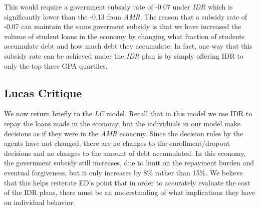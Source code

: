   This would require a government subsidy rate of -0.07 under \textit{IDR} which is significantly
  lower than the -0.13 from \textit{AMR}. The reason that a subsidy rate of -0.07 can maintain the
  same goverment subsidy is that we have increased the volume of student loans in the economy by
  changing what fraction of students accumulate debt and how much debt they accumulate. In fact, one
  way that this subsidy rate can be achieved under the \textit{IDR} plan is by simply offering IDR
  to only the top three GPA quartiles.


\subsection{Lucas Critique} \label{subsec:idr_lc}

  We now return briefly to the \textit{LC} model. Recall that in this model we use IDR to repay the
  loans made in the economy, but the individuals in our model make decisions as if they were in the
  \textit{AMR} economy. Since the decision rules by the agents have not changed, there are no
  changes to the enrollment/dropout decisions and no changes to the amount of debt accumulated. In
  this economy, the government subsidy still increases, due to limit on the repayment burden and
  eventual forgiveness, but it only increases by 8\% rather than 15\%. We believe that this helps
  reiterate ED's point that in order to accurately evaluate the cost of the IDR plans, there must be
  an understanding of what implications they have on individual behavior.
